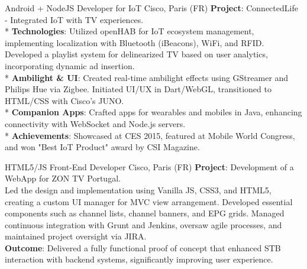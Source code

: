 \documentclass[
  a4paper,
   maincolor=cvblue,
   sectioncolor=cvblue,
]{fortysecondscv}
\begin{document}
\begin{cvtable}
    {Android + NodeJS Developer for IoT}
    {Cisco,  Paris (FR)}
    {
      \textbf{Project}: ConnectedLife - Integrated IoT with TV experiences.\\
      * \textbf{Technologies}: Utilized openHAB for IoT ecosystem management, implementing localization with Bluetooth (iBeacons), WiFi, and RFID. Developed a playlist system for delinearized TV based on user analytics, incorporating dynamic ad insertion.\\
      * \textbf{Ambilight \& UI}: Created real-time ambilight effects using GStreamer and Philips Hue via Zigbee. Initiated UI/UX in Dart/WebGL, transitioned to HTML/CSS with Cisco’s JUNO.\\
      * \textbf{Companion Apps}: Crafted apps for wearables and mobiles in Java, enhancing connectivity with WebSocket and Node.js servers.\\
      * \textbf{Achievements}: Showcased at CES 2015, featured at Mobile World Congress, and won "Best IoT Product" award by CSI Magazine.\\
    }
\end{cvtable}



\begin{cvtable}
    {HTML5/JS Front-End Developer}
    {Cisco,  Paris (FR)}
    {
      \textbf{Project}: Development of a WebApp for ZON TV Portugal.\\
        Led the design and implementation using Vanilla JS, CSS3, and HTML5, creating a custom UI manager for MVC view arrangement.
        Developed essential components such as channel lists, channel banners, and EPG grids.
        Managed continuous integration with Grunt and Jenkins, oversaw agile processes, and maintained project oversight via JIRA.\\
      \textbf{Outcome}:
        Delivered a fully functional proof of concept that enhanced STB interaction with backend systems, significantly improving user experience.
    }
\end{cvtable}
\end{document}
